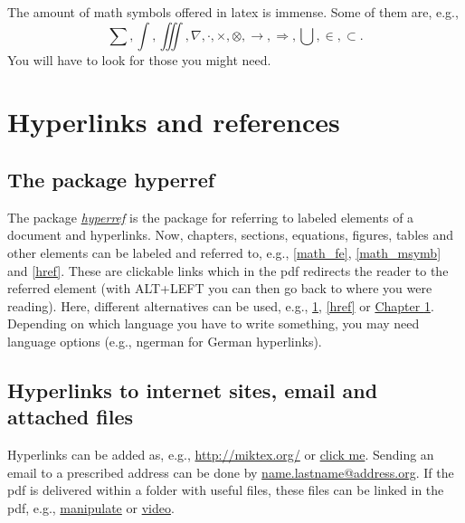 \documentclass[a4paper,11pt,oneside]{book}
\newcommand{\imp}[1]{\underline{\textit{#1}}}
\begin{document}
The amount of math symbols offered in latex is immense. Some of them are, e.g., 
\begin{equation}
	\sum , \int , \iiint , \nabla , \cdot , \times , \otimes , \rightarrow , \Rightarrow , \bigcup , \in , \subset .
\end{equation}
You will have to look for those you might need.


\chapter{Hyperlinks and references}
\label{href}


\section{The package hyperref}

The package \imp{hyperref} is the package for referring to labeled elements of a document and hyperlinks. Now, chapters, sections, equations, figures, tables and other elements can be labeled and referred to, e.g., \autoref{math_fe}, \autoref{math_msymb} and \autoref{href}. These are clickable links which in the pdf redirects the reader to the referred element (with ALT+LEFT you can then go back to where you were reading). Here, different alternatives can be used, e.g., \ref{href}, \autoref{href} or \hyperref[href]{Chapter \ref*{href}}. Depending on which language you have to write something, you may need language options (e.g., ngerman for German hyperlinks).


\section{Hyperlinks to internet sites, email and attached files}

Hyperlinks can be added as, e.g., \url{http://miktex.org/} or \href{http://miktex.org/}{click me}. Sending an email to a prescribed address can be done by \href{mailto:name.lastname@address.org}{name.lastname@address.org}. If the pdf is delivered within a folder with useful files, these files can be linked in the pdf, e.g., \href{run:attachments/manipulate.nb}{manipulate} or \href{run:attachments/video.mp4}{video}.
\end{document}
